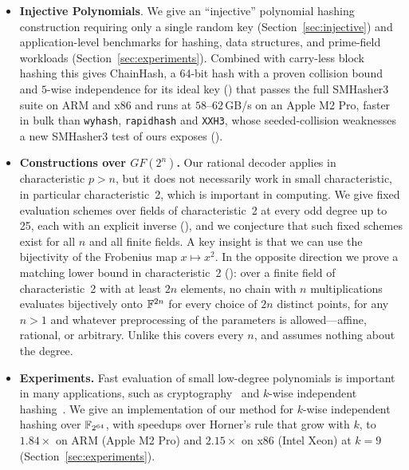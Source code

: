 \begin{itemize}
   \item \textbf{Injective Polynomials}. We give an ``injective'' polynomial hashing construction requiring only a single random key (Section~\ref{sec:injective}) and application-level benchmarks for hashing, data structures, and prime-field workloads (Section~\ref{sec:experiments}).
      Combined with carry-less block hashing this gives ChainHash, a 64-bit hash with a proven collision bound and $5$-wise independence for its ideal key () that passes the full SMHasher3 suite on ARM and x86 and runs at $58$--$62$\,GB/s on an Apple M2 Pro, faster in bulk than \texttt{wyhash}, \texttt{rapidhash} and \texttt{XXH3}, whose seeded-collision weaknesses a new SMHasher3 test of ours exposes ().
   \item \textbf{Constructions over $GF(2^n)$.}
      Our rational decoder applies in characteristic $p>n$, but it does not necessarily work in small characteristic, in particular characteristic~2, which is important in computing.
      We give fixed evaluation schemes over fields of characteristic~2 at
      every odd degree up to 25, each with an explicit inverse
      (), and we conjecture that such fixed
      schemes exist for all $n$ and all finite fields.
      A key insight is that we can use the bijectivity of the Frobenius map $x \mapsto x^2$.
      In the opposite direction we prove a matching lower bound in characteristic~2
      (): over a finite field of characteristic~2 with at least
      $2n$ elements, no chain with $n$ multiplications evaluates bijectively onto
      $\mathbb{F}^{2n}$ for every choice of $2n$ distinct points, for any $n>1$ and whatever preprocessing of the
      parameters is allowed---affine, rational, or arbitrary.  Unlike 
      this covers every $n$, and assumes nothing about the degree.
   \item \textbf{Experiments.}
      Fast evaluation of small low-degree polynomials is important in many applications, such as cryptography~\cite{DBLP:conf/fse/CarletGPQR12} and $k$-wise independent hashing~\cite{wegman1981new, patracscu2012power}.
      We give an implementation of our method for $k$-wise independent hashing over $\mathbb{F}_{2^{64}}$, with speedups over Horner's rule that grow with $k$, to $1.84\times$ on ARM (Apple M2 Pro) and $2.15\times$ on x86 (Intel Xeon) at $k=9$ (Section~\ref{sec:experiments}).
\end{itemize}
